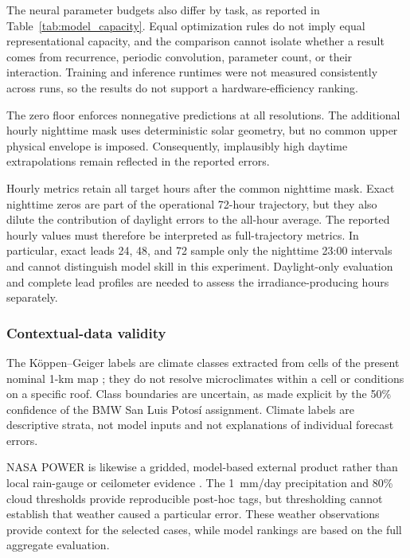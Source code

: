 The neural parameter budgets also differ by task, as reported in
Table~\ref{tab:model_capacity}. Equal optimization rules do not imply equal
representational capacity, and the comparison cannot isolate whether a result
comes from recurrence, periodic convolution, parameter count, or their
interaction. Training and inference runtimes were not measured consistently
across runs, so the results do not support a hardware-efficiency ranking.

The zero floor enforces nonnegative predictions at all resolutions. The
additional hourly nighttime mask uses deterministic solar geometry, but no
common upper physical envelope is imposed. Consequently, implausibly high
daytime extrapolations remain reflected in the reported errors.

Hourly metrics retain all target hours after the common nighttime mask. Exact
nighttime zeros are part of the operational 72-hour trajectory, but they also
dilute the contribution of daylight errors to the all-hour average. The
reported hourly values must therefore be interpreted as full-trajectory
metrics. In particular, exact leads 24, 48, and 72 sample only the nighttime
23:00 intervals and cannot distinguish model skill in this experiment.
Daylight-only evaluation and complete lead profiles are needed to assess
the irradiance-producing hours separately.

\subsubsection{Contextual-data validity}

The K\"oppen--Geiger labels are climate classes extracted from cells of the
present nominal 1-km map \cite{beck2018}; they do not resolve microclimates within a cell or
conditions on a specific roof. Class boundaries are uncertain, as made explicit
by the 50\% confidence of the BMW San Luis Potos\'i assignment. Climate labels
are descriptive strata, not model inputs and not explanations of individual
forecast errors.

NASA POWER is likewise a gridded, model-based external product rather than
local rain-gauge or ceilometer evidence \cite{nasapowerdaily}. The 1~mm/day
precipitation and 80\% cloud thresholds provide reproducible post-hoc tags, but
thresholding cannot establish that weather caused a particular error.
These weather observations provide context for the selected cases, while
model rankings are based on the full aggregate evaluation.
